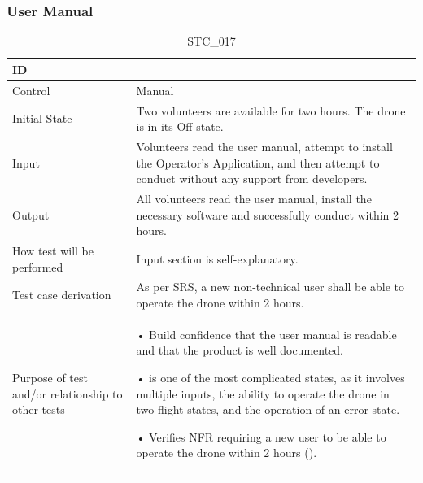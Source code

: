\documentclass[12pt, titlepage]{article}
\begin{document}
\subsubsection{User Manual}
\begin{table}[!h]
\begin{center}
\caption {STC\_017}
\label{tab:STC_017}
\begin{tabular}{ | m{3.2cm} | m{12.2cm} | } 
\hline
ID & \nameref{tab:STC_017} \\ 
\hline
Control & Manual \\ 
\hline
Initial State & Two volunteers are available for two hours. The drone is in its Off state. \\ 
\hline
Input & Volunteers read the user manual, attempt to install the Operator's Application, and then attempt to conduct \nameref{tab:STC_012} without any support from developers. \\ 
\hline
Output &  All volunteers read the user manual, install the necessary software and successfully conduct \nameref{tab:STC_012} within 2 hours. 
 \\ 
\hline
How test will be performed & Input section is self-explanatory.\\ 
\hline
Test case derivation & As per SRS, a new non-technical user shall be able to operate the drone within 2 hours.
 \\ 
\hline
Purpose of test and/or relationship to other tests &  • Build confidence that the user manual is readable and that the product is well documented.

• \nameref{tab:STC_012} is one of the most complicated states, as it involves multiple inputs, the ability to operate the drone in two flight states, and the operation of an error state. 

• Verifies NFR requiring a new user to be able to operate the drone within 2 hours (\nameref{USE_004}). 
\\ 
\hline
\end{tabular}
\end{center}
\end{table}
\end{document}
